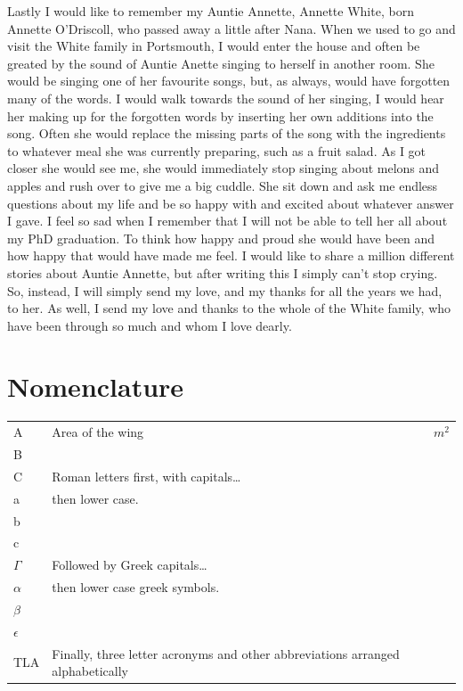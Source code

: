 \documentclass[a4paper,oneside,12pt]{book}
\numberwithin{equation}{chapter} %
\begin{document}
Lastly I would like to remember my Auntie Annette, Annette White, born Annette O'Driscoll, who passed away a little after Nana. When we used to go and visit the White family in Portsmouth, I would enter the house and often be greated by the sound of Auntie Anette singing to herself in another room. She would be singing one of her favourite songs, but, as always, would have forgotten many of the words. I would walk towards the sound of her singing, I would hear her making up for the forgotten words by inserting her own additions into the song. Often she would replace the missing parts of the song with the ingredients to whatever meal she was currently preparing, such as a fruit salad. As I got closer she would see me, she would immediately stop singing about melons and apples and rush over to give me a big cuddle. She sit down and ask me endless questions about my life and be so happy with and excited about whatever answer I gave. I feel so sad when I remember that I will not be able to tell her all about my PhD graduation. To think how happy and proud she would have been and how happy that would have made me feel. I would like to share a million different stories about Auntie Annette, but after writing this I simply can't stop crying. So, instead, I will simply send my love, and my thanks for all the years we had, to her. As well, I send my love and thanks to the whole of the White family, who have been through so much and whom I love dearly.
\fi


\tableofcontents
\listoffigures
\listoftables
\listoftodos
\printnomenclature
\newpage
%




\iffalse
\newpage
\section*{\Huge{Nomenclature}}
\begin{tabular}{lp{9cm}l}
A&Area of the wing&$m^{2}$\\
B\\
C& Roman letters first, with capitals\ldots\\
a&then lower case.\\
b\\
c\\
$\Gamma$&Followed by Greek capitals\ldots\\
$\alpha$&then lower case greek symbols.\\
$\beta$\\
$\epsilon$\\
TLA&Finally, three letter acronyms and other abbreviations arranged alphabetically\\
\end{tabular}
\vspace{2cm}
\end{document}
